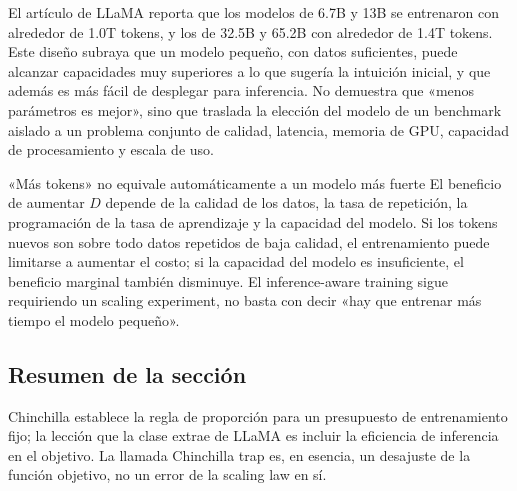 El artículo de LLaMA reporta que los modelos de 6.7B y 13B se entrenaron con alrededor de 1.0T tokens, y los de 32.5B y 65.2B con alrededor de 1.4T tokens. Este diseño subraya que un modelo pequeño, con datos suficientes, puede alcanzar capacidades muy superiores a lo que sugería la intuición inicial, y que además es más fácil de desplegar para inferencia. No demuestra que «menos parámetros es mejor», sino que traslada la elección del modelo de un benchmark aislado a un problema conjunto de calidad, latencia, memoria de GPU, capacidad de procesamiento y escala de uso.

\begin{warningbox}{«Más tokens» no equivale automáticamente a un modelo más fuerte}
El beneficio de aumentar $D$ depende de la calidad de los datos, la tasa de repetición, la programación de la tasa de aprendizaje y la capacidad del modelo. Si los tokens nuevos son sobre todo datos repetidos de baja calidad, el entrenamiento puede limitarse a aumentar el costo; si la capacidad del modelo es insuficiente, el beneficio marginal también disminuye. El inference-aware training sigue requiriendo un scaling experiment, no basta con decir «hay que entrenar más tiempo el modelo pequeño».
\end{warningbox}


\subsection{Resumen de la sección}

Chinchilla establece la regla de proporción para un presupuesto de entrenamiento fijo; la lección que la clase extrae de LLaMA es incluir la eficiencia de inferencia en el objetivo. La llamada Chinchilla trap es, en esencia, un desajuste de la función objetivo, no un error de la scaling law en sí.
